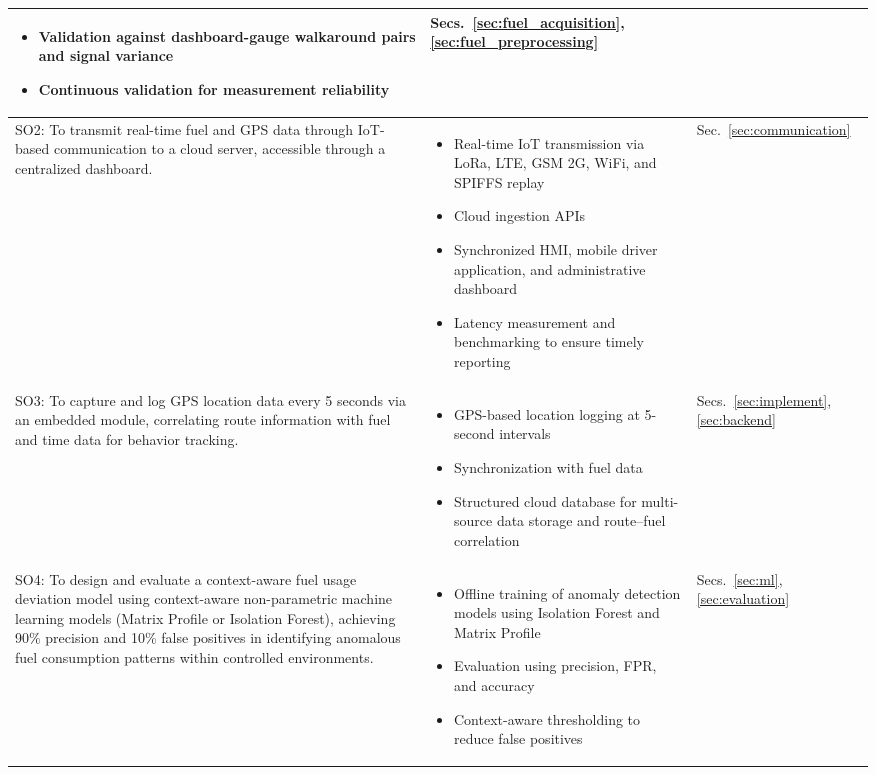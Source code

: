\begin{center}
\begin{tabularx}{\textwidth}{p{}|X|p{}}
\begin{itemize}
    \item Validation against dashboard-gauge walkaround pairs and signal variance
    \item Continuous validation for measurement reliability
\end{itemize} & Secs.~\ref{sec:fuel_acquisition}, \ref{sec:fuel_preprocessing} \\
\hline 
SO2: To transmit real-time fuel and GPS data through IoT-based communication to a cloud server, accessible through a centralized dashboard. &
\begin{itemize}
    \item Real-time IoT transmission via LoRa, LTE, GSM 2G, WiFi, and SPIFFS replay
    \item Cloud ingestion APIs
    \item Synchronized HMI, mobile driver application, and administrative dashboard
    \item Latency measurement and benchmarking to ensure timely reporting
\end{itemize} & Sec.~\ref{sec:communication} \\
\hline 
SO3: To capture and log GPS location data every 5 seconds via an embedded module, correlating route information with fuel and time data for behavior tracking. &
\begin{itemize}
    \item GPS-based location logging at 5-second intervals
    \item Synchronization with fuel data
    \item Structured cloud database for multi-source data storage and route–fuel correlation
\end{itemize} & Secs.~\ref{sec:implement}, \ref{sec:backend} \\
\hline 
SO4: To design and evaluate a context-aware fuel usage deviation model using context-aware non-parametric machine learning models (Matrix Profile or Isolation Forest), achieving 90\% precision and 10\% false positives in identifying anomalous fuel consumption patterns within controlled environments. &
\begin{itemize}
    \item Offline training of anomaly detection models using Isolation Forest and Matrix Profile
    \item Evaluation using precision, FPR, and accuracy
    \item Context-aware thresholding to reduce false positives
\end{itemize} & Secs.~\ref{sec:ml}, \ref{sec:evaluation} \\

\end{tabularx}
\end{center}
